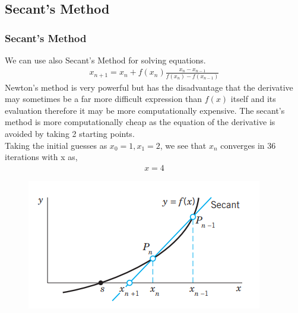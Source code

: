 \documentclass{beamer}
\providecommand{\brak}[1]{\ensuremath{\left(#1\right)}}
\theoremstyle{remark}
\numberwithin{equation}{section}
\begin{document}
\subsection{Secant's Method}
\begin{frame}
	\frametitle{Secant's Method}
	We can use also Secant's Method for solving equations.
	\begin{align}
		x_{n+1} = x_n + f\brak{x_n}\frac{x_{n} -  x_{n-1}}{f(x_{n}) -  f(x_{n-1})}
	\end{align}
	Newton's method is very powerful but has the disadvantage that the derivative may sometimes be a far more difficult expression than \(f(x)\) itself and its evaluation therefore it may be more computationally expensive. The secant's method is more computationally cheap as the equation of the derivative is avoided by taking 2 starting points.\\ 
	Taking the initial guesses as $x_0 = 1, x_1 = 2$, we see that $x_n$ converges in 36 iterations with x as,
	\begin{align}
		x = 4
	\end{align} 
\end{frame}
\begin{frame}
	\begin{figure}[h]
		\centering
		\includegraphics[width=0.7\linewidth]{figs/secant.png}
		\caption{}
	\end{figure}
\end{frame}
\end{document}
